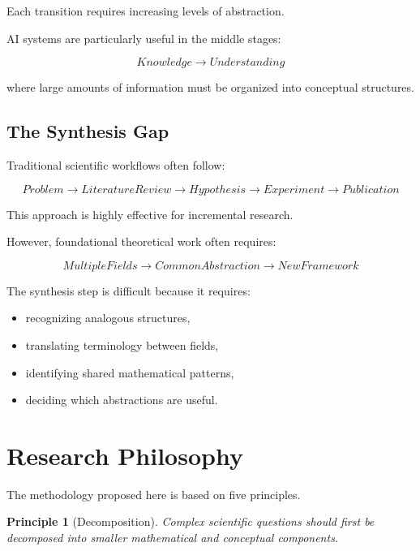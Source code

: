 \documentclass[11pt]{article}
\newtheorem{principle}{Principle}
\begin{document}
Each transition requires increasing levels of abstraction.



AI systems are particularly useful in the middle stages:


\[
Knowledge
\rightarrow
Understanding
\]


where large amounts of information must be organized into conceptual
structures.



\subsection{The Synthesis Gap}


Traditional scientific workflows often follow:


\[
Problem
\rightarrow
Literature Review
\rightarrow
Hypothesis
\rightarrow
Experiment
\rightarrow
Publication
\]


This approach is highly effective for incremental research.


However, foundational theoretical work often requires:


\[
Multiple Fields
\rightarrow
Common Abstraction
\rightarrow
New Framework
\]


The synthesis step is difficult because it requires:


\begin{itemize}

\item recognizing analogous structures,

\item translating terminology between fields,

\item identifying shared mathematical patterns,

\item deciding which abstractions are useful.

\end{itemize}



\section{Research Philosophy}


The methodology proposed here is based on five principles.



\begin{principle}[Decomposition]


Complex scientific questions should first be decomposed into smaller
mathematical and conceptual components.


\end{principle}
\end{document}

